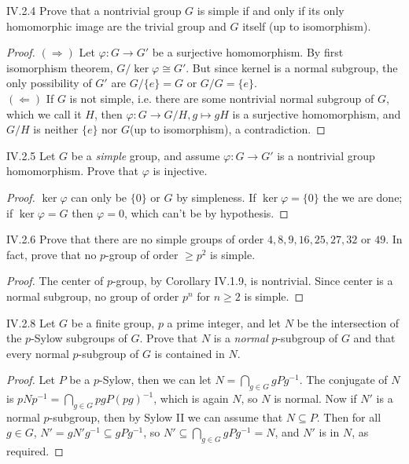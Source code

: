 \begin{problem}{IV.2.4}
Prove that a nontrivial group $G$ is simple if and only if its only homomorphic image are the trivial group and $G$ itself (up to isomorphism).
\end{problem}
\begin{proof}

\noindent $(\Rightarrow)$ Let $\varphi : G \to G'$ be a surjective homomorphism. By first isomorphism theorem, $G/\ker \varphi \cong G'$. But since kernel is a normal subgroup, the only possibility of $G'$ are $G/\{e\} = G$ or $G/G = \{e\}$. \\
$(\Leftarrow)$ If $G$ is not simple, i.e. there are some nontrivial normal subgroup of $G$, which we call it $H$, then $\varphi : G \to G/H,g \mapsto gH$ is a surjective homomorphism, and $G/H$ is neither $\{e\}$ nor $G$(up to isomorphism), a contradiction. 
\end{proof}

\begin{problem}{IV.2.5}
Let $G$ be a \emph{simple} group, and assume $\varphi: G \to G'$ is a nontrivial group homomorphism. Prove that $\varphi$ is injective.
\end{problem}
\begin{proof}
$\ker \varphi$ can only be $\{0\}$ or $G$ by simpleness. If $\ker \varphi = \{0\}$ the we are done; if $\ker \varphi = G$ then $\varphi = 0$, which can't be by hypothesis.
\end{proof}

\begin{problem}{IV.2.6}
Prove that there are no simple groups of order $4, 8, 9, 16, 25, 27, 32$ or $49$. In fact, prove that no $p$-group of order $\geq p^2$ is simple.
\end{problem}
\begin{proof}
The center of $p$-group, by Corollary IV.1.9, is nontrivial. Since center is a normal subgroup, no group of order $p^n$ for $n \geq 2$ is simple.    
\end{proof}

\begin{problem}{IV.2.8}
Let $G$ be a finite group, $p$ a prime integer, and let $N$ be the intersection of the $p$-Sylow subgroups of $G$. Prove that $N$ is a \emph{normal} $p$-subgroup of $G$ and that every normal $p$-subgroup of $G$ is contained in $N$.
\end{problem}
\begin{proof}
Let $P$ be a $p$-Sylow, then we can let $N = \bigcap_{g \in G}gPg^{-1}$. The conjugate of $N$ is $pNp^{-1} = \bigcap_{g \in G}pgP(pg)^{-1}$, which is again $N$, so $N$ is normal. Now if $N'$ is a normal $p$-subgroup, then by Sylow II we can assume that $N \subseteq P$. Then for all $g \in G$, $N' = gN'g^{-1} \subseteq gPg^{-1}$, so $N' \subseteq \bigcap_{g \in G}gPg^{-1} = N$, and $N'$ is in $N$, as required. 
\end{proof}

